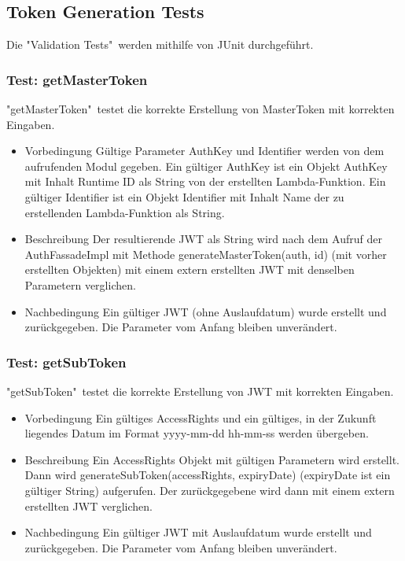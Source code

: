 \documentclass[a4paper,20pt,oneside]{book}
\begin{document}
\subsection{Token Generation Tests}
Die "Validation Tests"\ werden mithilfe von JUnit durchgeführt. 
\subsubsection{Test: getMasterToken}
"getMasterToken"\ testet die korrekte Erstellung von MasterToken mit korrekten Eingaben.

\begin{itemize}
\item Vorbedingung\linebreak
Gültige Parameter AuthKey und Identifier werden von dem aufrufenden Modul gegeben. Ein gültiger AuthKey ist ein Objekt AuthKey mit Inhalt Runtime ID als String von der erstellten Lambda-Funktion. Ein gültiger Identifier ist ein Objekt Identifier mit Inhalt Name der zu erstellenden Lambda-Funktion als String. 
\item Beschreibung\linebreak
Der resultierende JWT als String wird nach dem Aufruf der AuthFassadeImpl mit Methode generateMasterToken(auth, id) (mit vorher erstellten Objekten) mit einem extern erstellten JWT mit denselben Parametern verglichen.
\item Nachbedingung\linebreak
Ein gültiger JWT (ohne Auslaufdatum) wurde erstellt und zurückgegeben. Die Parameter vom Anfang bleiben unverändert.
\end{itemize}
	

\subsubsection{Test: getSubToken}
"getSubToken"\ testet die korrekte Erstellung von JWT mit korrekten Eingaben.
\begin{itemize}
\item Vorbedingung\linebreak
Ein gültiges AccessRights und ein gültiges, in der Zukunft liegendes Datum im Format yyyy-mm-dd hh-mm-ss werden übergeben.
\item Beschreibung\linebreak
Ein AccessRights Objekt mit gültigen Parametern wird erstellt. Dann wird generateSubToken(accessRights, expiryDate) (expiryDate ist ein gültiger String) aufgerufen. Der zurückgegebene wird dann mit einem extern erstellten JWT verglichen.
\item Nachbedingung\linebreak
Ein gültiger JWT mit Auslaufdatum wurde erstellt und zurückgegeben. Die Parameter vom Anfang bleiben unverändert.
\end{itemize}
\end{document}
